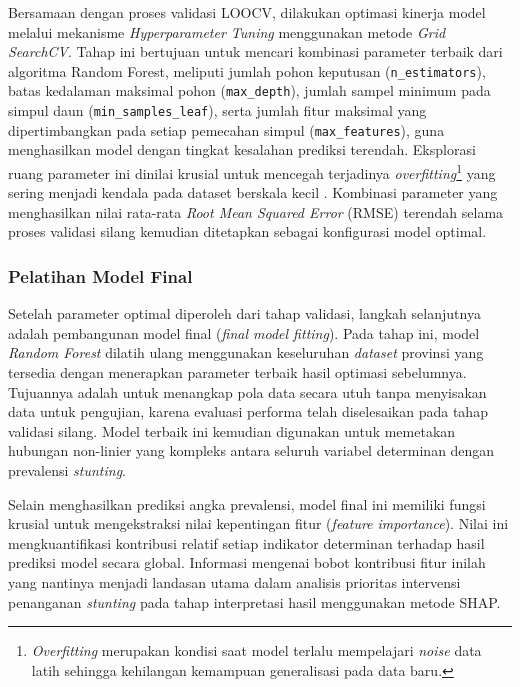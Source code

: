 Bersamaan dengan proses validasi LOOCV, dilakukan optimasi kinerja model melalui mekanisme \textit{Hyperparameter Tuning} menggunakan metode \textit{Grid SearchCV}. Tahap ini bertujuan untuk mencari kombinasi parameter terbaik dari algoritma Random Forest, meliputi jumlah pohon keputusan (\texttt{n\_estimators}), batas kedalaman maksimal pohon (\texttt{max\_depth}), jumlah sampel minimum pada simpul daun (\texttt{min\_samples\_leaf}), serta jumlah fitur maksimal yang dipertimbangkan pada setiap pemecahan simpul (\texttt{max\_features}), guna menghasilkan model dengan tingkat kesalahan prediksi terendah. Eksplorasi ruang parameter ini dinilai krusial untuk mencegah terjadinya \textit{overfitting}\footnote{\textit{Overfitting} merupakan kondisi saat model terlalu mempelajari \textit{noise} data latih sehingga kehilangan kemampuan generalisasi pada data baru.} yang sering menjadi kendala pada dataset berskala kecil \cite{fatmawati2024random}. Kombinasi parameter yang menghasilkan nilai rata-rata \textit{Root Mean Squared Error} (RMSE) terendah selama proses validasi silang kemudian ditetapkan sebagai konfigurasi model optimal.

\subsubsection{Pelatihan Model Final}
Setelah parameter optimal diperoleh dari tahap validasi, langkah selanjutnya adalah pembangunan model final (\textit{final model fitting}). Pada tahap ini, model \textit{Random Forest} dilatih ulang menggunakan keseluruhan \textit{dataset} provinsi yang tersedia dengan menerapkan parameter terbaik hasil optimasi sebelumnya. Tujuannya adalah untuk menangkap pola data secara utuh tanpa menyisakan data untuk pengujian, karena evaluasi performa telah diselesaikan pada tahap validasi silang. Model terbaik ini kemudian digunakan untuk memetakan hubungan non-linier yang kompleks antara seluruh variabel determinan dengan prevalensi \textit{stunting}.

Selain menghasilkan prediksi angka prevalensi, model final ini memiliki fungsi krusial untuk mengekstraksi nilai kepentingan fitur (\textit{feature importance}). Nilai ini mengkuantifikasi kontribusi relatif setiap indikator determinan terhadap hasil prediksi model secara global. Informasi mengenai bobot kontribusi fitur inilah yang nantinya menjadi landasan utama dalam analisis prioritas intervensi penanganan \textit{stunting} pada tahap interpretasi hasil menggunakan metode SHAP.

